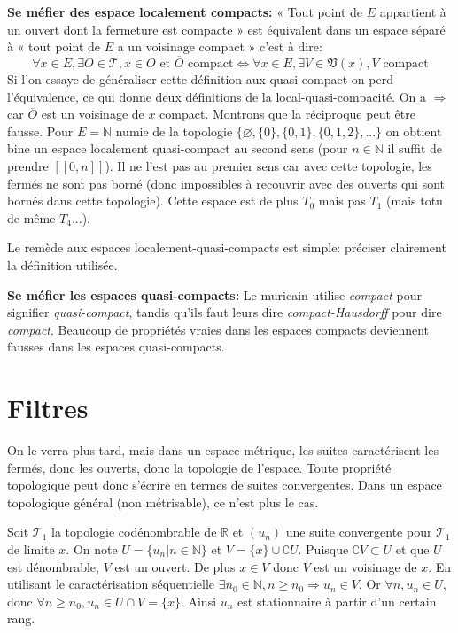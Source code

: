 \documentclass[a4paper, 11pt, french]{book}
\theoremstyle{plain} %
\theoremstyle{definition} %
\theoremstyle{remark} %
\newcommand{\1}{\mathds{1}}
\newcommand\vide{\varnothing}
\newcommand{\supegal}{\geqslant}
\newcommand\et{\text{ et }}
\newcommand{\N}{\mathbb{N}}
\newcommand{\R}{\mathbb{R}}
\newcommand\intervalle[1]{[\![#1]\!]}
\begin{document}
\textbf{Se méfier des espace localement compacts:}
« Tout point de $E$ appartient à un ouvert dont la fermeture est compacte » est équivalent dans un espace séparé à « tout point de $E$ a un voisinage compact » c'est à dire:
$$
\forall x\in E, \exists O\in\mathscr{T}, x\in O\et\overline{O}\text{ compact}
\iff
\forall x\in E, \exists V\in\mathfrak{V}(x), V\text{ compact}
$$
Si l'on essaye de généraliser cette définition aux quasi-compact on perd l'équivalence, ce qui donne deux définitions de la local-quasi-compacité.
On a $\Rightarrow$ car $\overline{O}$ est un voisinage de $x$ compact.
Montrons que la réciproque peut être fausse.
Pour $E=\N$ numie de la topologie $\{\vide, \{0\}, \{0, 1\}, \{0, 1, 2\}, ...\}$ on obtient bine un espace localement quasi-compact au second sens (pour $n\in\N$ il suffit de prendre $\intervalle{0, n}$).
Il ne l'est pas au premier sens car avec cette topologie, les fermés ne sont pas borné (donc impossibles à recouvrir avec des ouverts qui sont bornés dans cette topologie).
Cette espace est de plus $T_0$ mais pas $T_1$ (mais totu de même $T_4$...).

Le remède aux espaces localement-quasi-compacts est simple: préciser clairement la définition utilisée.

\textbf{Se méfier les espaces quasi-compacts:}
Le muricain utilise \textit{compact} pour signifier \textit{quasi-compact}, tandis qu'ils faut leurs dire \textit{compact-Hausdorff} pour dire \textit{compact}.
Beaucoup de propriétés vraies dans les espaces compacts deviennent fausses dans les espaces quasi-compacts.

\chapter{Filtres}

On le verra plus tard, mais dans un espace métrique, les suites caractérisent les fermés, donc les ouverts, donc la topologie de l’espace.
Toute propriété topologique peut donc s’écrire en termes de suites convergentes.
Dans un espace topologique général (non métrisable), ce n’est plus le cas.

Soit $\mathscr{T}_1$ la topologie codénombrable de $\R$ et $(u_n)$ une suite convergente pour $\mathscr{T}_1$ de limite $x$.
On note $U=\{u_n|n\in\N\}$ et $V=\{x\}\cup\complement U$.
Puisque $\complement V\subset U$ et que $U$ est dénombrable, $V$ est un ouvert.
De plus $x\in V$ donc $V$ est un voisinage de $x$.
En utilisant le caractérisation séquentielle $\exists n_0\in\N, n\supegal n_0\Rightarrow u_n\in V$.
Or $\forall n, u_n\in U$, donc $\forall n\supegal n_0, u_n\in U\cap V=\{x\}$.
Ainsi $u_n$ est stationnaire à partir d'un certain rang.
\end{document}
